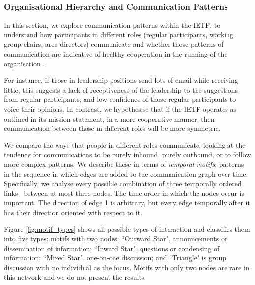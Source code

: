 \documentclass[twocolumn,10pt]{article}
\newcommand{\pb}[1]{\vspace{0.75ex}\noindent{\textbf{#1}}}
\begin{document}
\subsubsection{Organisational Hierarchy and Communication Patterns}
\label{sec:org-dyn:hierarchy:rq2}



In this section, we explore communication patterns within the IETF, to
understand how participants in different roles (regular participants,
working group chairs, area directors) communicate and whether those
patterns of communication are indicative of healthy cooperation in the
running of the organisation \cite{li2021does,duan2018authoritarian}.

For instance, if those in leadership positions send lots of email while
receiving little, this suggests a lack of receptiveness of the leadership
to the suggestions from regular participants, and low confidence of those
regular participants to voice their opinions. In contrast, we hypothesise
that if the IETF operates as outlined in its mission statement, in a more
cooperative manner, then communication between those in different roles
will be more symmetric.

\pb{Temporal Motifs:}
We compare the ways that people in different roles communicate, looking
at the tendency for communications to be purely inbound, purely outbound,
or to follow more complex patterns. 
%
%
We describe these in terms of \emph{temporal motifs}: patterns in the
sequence in which edges are added to the communication graph over time.
Specifically, we analyse every possible combination of three temporally
ordered links~\cite{paranjape2017motifs} between at most three nodes.
The time order in which the nodes occur is important.  The direction of
edge 1 is arbitrary, but every edge temporally after it has their direction
oriented with respect to it. 

Figure \ref{fig:motif_types} shows all possible types of interaction and
classifies them into five types: motifs with two nodes; ``Outward Star",
announcements or dissemination of information; ``Inward Star", questions or
condensing of information; ``Mixed Star", one-on-one discussion; and
``Triangle" is group discussion with no individual as the focus. Motifs
with only two nodes  are rare in this network and we do not present the
results.
\end{document}
